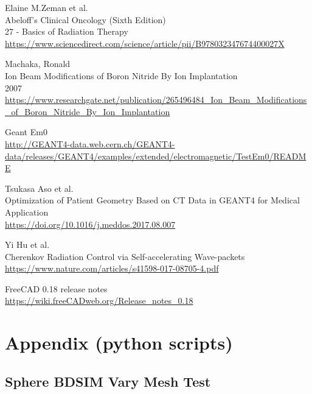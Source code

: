 \documentclass[12pt,a4paper]{article}
\begin{document}
\begin{thebibliography}{1}
	Elaine M.Zeman et al.\\
	Abeloff's Clinical Oncology (Sixth Edition)\\
	27 - Basics of Radiation Therapy\\
	\url{https://www.sciencedirect.com/science/article/pii/B978032347674400027X}
	
	Machaka, Ronald\\
	Ion Beam Modifications of Boron Nitride By Ion Implantation\\
	2007\\
	\url{https://www.researchgate.net/publication/265496484_Ion_Beam_Modifications_of_Boron_Nitride_By_Ion_Implantation}
	
	Geant Em0\\
	\url{http://GEANT4-data.web.cern.ch/GEANT4-data/releases/GEANT4/examples/extended/electromagnetic/TestEm0/README}

	Tsukasa Aso et al.\\
	Optimization of Patient Geometry Based on CT Data in GEANT4 for Medical Application\\
	\url{https://doi.org/10.1016/j.meddos.2017.08.007}

	Yi Hu et al.\\
	Cherenkov Radiation Control via Self-accelerating Wave-packets\\
	\url{https://www.nature.com/articles/s41598-017-08705-4.pdf}

	FreeCAD 0.18 release notes\\
	\url{https://wiki.freeCADweb.org/Release_notes_0.18}

\end{thebibliography}

\normalsize
\newpage
\appendix
\section{Appendix (python scripts)}
\subsection{Sphere BDSIM Vary Mesh Test}
\label{ap1}


%
\end{document}
